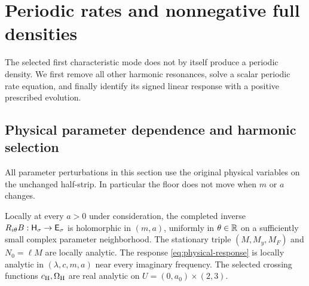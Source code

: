 \section{Periodic rates and nonnegative full densities}\label{sec:periodic}

The selected first characteristic mode does not by itself produce a
periodic density. We first remove all other harmonic resonances, solve
a scalar periodic rate equation, and finally identify its signed
linear response with a positive prescribed evolution.

\subsection{Physical parameter dependence and harmonic selection}

All parameter perturbations in this section use the original physical
variables on the unchanged half-strip. In particular the floor does
not move when $m$ or $a$ changes.

\begin{lemma}\label{lem:parameter-analyticity}
Locally at every $a>0$ under consideration, the completed inverse
$R_{i\theta}B:\mathsf H_\sigma\to\mathsf E_\sigma$ is holomorphic in $(m,a)$,
uniformly in $\theta\in\mathbb R$ on a sufficiently small complex parameter
neighborhood. The stationary triple $(M,M_y,M_F)$ and $N_0=\ell M$
are locally analytic. The response \eqref{eq:physical-response} is
locally analytic in $(\lambda,c,m,a)$ near every imaginary frequency.
The selected crossing functions $c_{\mathrm H},\Omega_{\mathrm H}$ are real analytic on
$U=(0,a_0)\times(2,3)$.
\end{lemma}

